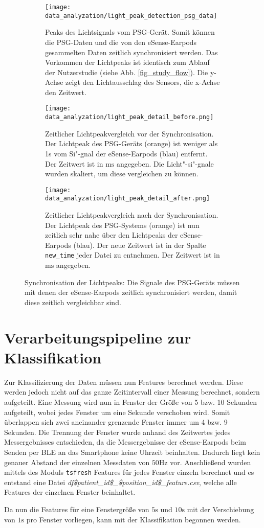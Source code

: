 \begin{figure}[ht]
  \centering
  \begin{subfigure}{0.66\textwidth}
    \texttt{[image: data\_analyzation/light\_peak\_detection\_psg\_data]}
    \caption{Peaks des Lichtsignals vom PSG-Gerät. Somit können die PSG-Daten und die von den eSense-Earpods gesammelten Daten zeitlich synchronisiert werden. Das Vorkommen der Lichtpeaks ist identisch zum Ablauf der Nutzerstudie (siehe Abb. \ref{fig_study_flow}). Die y-Achse zeigt den Lichtausschlag des Sensors, die x-Achse den Zeitwert.}
    \label{implementation:synchronisation:peaks_psg}
  \end{subfigure}
  \begin{subfigure}{.49\textwidth}
    \texttt{[image: data\_analyzation/light\_peak\_detail\_before.png]}
    \caption{Zeitlicher Lichtpeakvergleich vor der Synchronisation. Der Lichtpeak des PSG-Geräts (orange) ist weniger als 1s vom Si"-gnal der eSense-Earpods (blau) entfernt. Der Zeitwert ist in $\si{\ms}$ angegeben. Die Licht"-si"-gnale wurden skaliert, um diese vergleichen zu können. }
    \label{implementation:synchronisation:before_light_peak}
  \end{subfigure}
  \begin{subfigure}{.49\textwidth}
    \texttt{[image: data\_analyzation/light\_peak\_detail\_after.png]}
    \caption{Zeitlicher Lichtpeakvergleich nach der Synchronisation. Der Lichtpeak des PSG-Systems (orange) ist nun zeitlich sehr nahe über den Lichtpeaks der eSense-Earpods (blau). Der neue Zeitwert ist in der Spalte \texttt{new\_time} jeder Datei zu entnehmen. Der Zeitwert ist in $\si{\ms}$ angegeben.}
    \label{implementation:synchronisation:after_light_peak}
  \end{subfigure}
  \caption{Synchronisation der Lichtpeaks: Die Signale des PSG-Geräts müssen mit denen der eSense-Earpods zeitlich synchronisiert werden, damit diese zeitlich vergleichbar sind.}
  \label{implementation:synchronisation:peaks}
\end{figure}

\newpage
\section{Verarbeitungspipeline zur Klassifikation}
\label{ch:Implementierung:classification_pipeline}
Zur Klassifizierung der Daten müssen nun Features berechnet werden. 
Diese werden jedoch nicht auf das ganze Zeitintervall einer Messung berechnet, sondern aufgeteilt.
Eine Messung wird nun in Fenster der Größe von 5 bzw. 10 Sekunden aufgeteilt, wobei jedes Fenster um eine Sekunde verschoben wird. 
Somit überlappen sich zwei aneinander grenzende Fenster immer um 4 bzw. 9 Sekunden. 
Die Trennung der Fenster wurde anhand des Zeitwertes jedes Messergebnisses entschieden, da die Messergebnisse der eSense-Earpods beim Senden per BLE an das Smartphone keine Uhrzeit beinhalten.
Dadurch liegt kein genauer Abstand der einzelnen Messdaten von $50\si{\hertz}$ vor. 
Anschließend wurden mittels des Moduls \texttt{tsfresh} Features für jedes Fenster einzeln berechnet und es entstand eine Datei \textit{df\$patient\_id\$\_\$position\_id\$\_feature.csv}, welche alle Features der einzelnen Fenster beinhaltet.

Da nun die Features für eine Fenstergröße von $5\si{\s}$ und $10\si{\s}$ mit der Verschiebung von $1\si{\s}$ pro Fenster vorliegen, kann mit der Klassifikation begonnen werden.